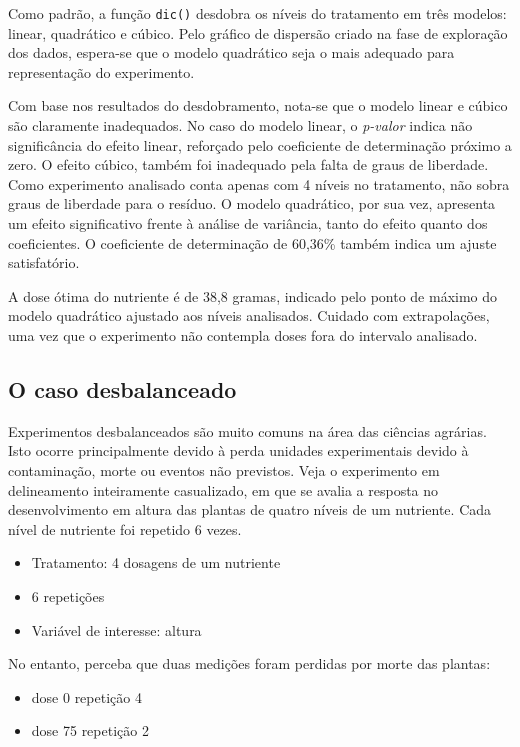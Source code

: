 \documentclass[
]{article}
\providecommand{\tightlist}{%
  \setlength{\itemsep}{0pt}\setlength{\parskip}{0pt}}
\begin{document}
Como padrão, a função \texttt{dic()} desdobra os níveis do tratamento em três modelos: linear, quadrático e cúbico. Pelo gráfico de dispersão criado na fase de exploração dos dados, espera-se que o modelo quadrático seja o mais adequado para representação do experimento.

Com base nos resultados do desdobramento, nota-se que o modelo linear e cúbico são claramente inadequados. No caso do modelo linear, o \emph{p-valor} indica não significância do efeito linear, reforçado pelo coeficiente de determinação próximo a zero. O efeito cúbico, também foi inadequado pela falta de graus de liberdade. Como experimento analisado conta apenas com 4 níveis no tratamento, não sobra graus de liberdade para o resíduo. O modelo quadrático, por sua vez, apresenta um efeito significativo frente à análise de variância, tanto do efeito quanto dos coeficientes. O coeficiente de determinação de 60,36\% também indica um ajuste satisfatório.

A dose ótima do nutriente é de 38,8 gramas, indicado pelo ponto de máximo do modelo quadrático ajustado aos níveis analisados. Cuidado com extrapolações, uma vez que o experimento não contempla doses fora do intervalo analisado.

\hypertarget{o-caso-desbalanceado}{%
\subsection{O caso desbalanceado}\label{o-caso-desbalanceado}}

Experimentos desbalanceados são muito comuns na área das ciências agrárias. Isto ocorre principalmente devido à perda unidades experimentais devido à contaminação, morte ou eventos não previstos. Veja o experimento em delineamento inteiramente casualizado, em que se avalia a resposta no desenvolvimento em altura das plantas de quatro níveis de um nutriente. Cada nível de nutriente foi repetido 6 vezes.

\begin{itemize}
\tightlist
\item
  Tratamento: 4 dosagens de um nutriente
\item
  6 repetições
\item
  Variável de interesse: altura
\end{itemize}

No entanto, perceba que duas medições foram perdidas por morte das plantas:

\begin{itemize}
\tightlist
\item
  dose 0 repetição 4
\item
  dose 75 repetição 2
\end{itemize}
\end{document}
